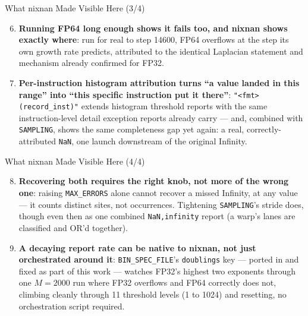 \documentclass{beamer}
\begin{document}
\begin{frame}{What nixnan Made Visible Here (3/4)}
\begin{enumerate}
\setcounter{enumi}{5}
  \item \textbf{Running FP64 long enough shows it fails too, and nixnan
    shows exactly where}: run for real to step 14600, FP64 overflows at
    the step its own growth rate predicts, attributed to the identical
    Laplacian statement and mechanism already confirmed for FP32.
  \item \textbf{Per-instruction histogram attribution turns ``a value
    landed in this range'' into ``this specific instruction put it
    there''}: \texttt{"<fmt> (record\_inst)"} extends histogram
    threshold reports with the same instruction-level detail exception
    reports already carry --- and, combined with \texttt{SAMPLING},
    shows the same completeness gap yet again: a real, correctly-
    attributed \texttt{NaN}, one launch downstream of the original
    Infinity.
\end{enumerate}
\end{frame}

\begin{frame}{What nixnan Made Visible Here (4/4)}
\begin{enumerate}
\setcounter{enumi}{7}
  \item \textbf{Recovering both requires the right knob, not more of the
    wrong one}: raising \texttt{MAX\_ERRORS} alone cannot recover a
    missed Infinity, at any value --- it counts distinct sites, not
    occurrences. Tightening \texttt{SAMPLING}'s stride does, though even
    then as one combined \texttt{NaN,infinity} report (a warp's lanes
    are classified and OR'd together).
  \item \textbf{A decaying report rate can be native to nixnan, not just
    orchestrated around it}: \texttt{BIN\_SPEC\_FILE}'s \texttt{doublings}
    key --- ported in and fixed as part of this work --- watches FP32's
    highest two exponents through one $M{=}2000$ run where FP32
    overflows and FP64 correctly does not, climbing cleanly through 11
    threshold levels (1 to 1024) and resetting, no orchestration script
    required.
\end{enumerate}
\end{frame}
\end{document}
